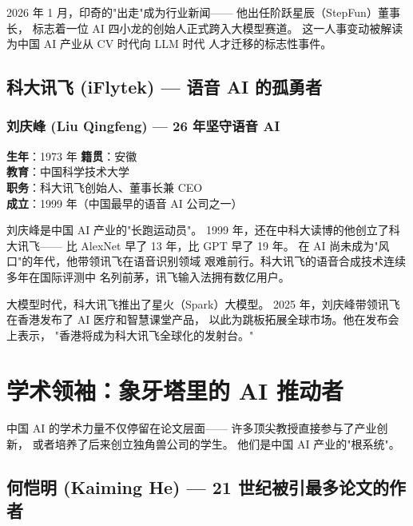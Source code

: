 2026 年 1 月，印奇的"出走"成为行业新闻——
他出任阶跃星辰（StepFun）董事长，
标志着一位 AI 四小龙的创始人正式跨入大模型赛道。
这一人事变动被解读为中国 AI 产业从 CV 时代向 LLM 时代
人才迁移的标志性事件。


\subsection{科大讯飞 (iFlytek) — 语音 AI 的孤勇者}

\subsubsection{刘庆峰 (Liu Qingfeng) — 26 年坚守语音 AI}

\begin{keybox}
\textbf{生年}：1973 年 \quad \textbf{籍贯}：安徽 \\
\textbf{教育}：中国科学技术大学 \\
\textbf{职务}：科大讯飞创始人、董事长兼 CEO \\
\textbf{成立}：1999 年（中国最早的语音 AI 公司之一）
\end{keybox}

刘庆峰是中国 AI 产业的"长跑运动员"。
1999 年，还在中科大读博的他创立了科大讯飞——
比 AlexNet 早了 13 年，比 GPT 早了 19 年。
在 AI 尚未成为"风口"的年代，他带领讯飞在语音识别领域
艰难前行。科大讯飞的语音合成技术连续多年在国际评测中
名列前茅，讯飞输入法拥有数亿用户。

大模型时代，科大讯飞推出了星火（Spark）大模型。
2025 年，刘庆峰带领讯飞在香港发布了 AI 医疗和智慧课堂产品，
以此为跳板拓展全球市场。他在发布会上表示，
"香港将成为科大讯飞全球化的发射台。"



\section{学术领袖：象牙塔里的 AI 推动者}
\label{sec:academics}

中国 AI 的学术力量不仅停留在论文层面——
许多顶尖教授直接参与了产业创新，
或者培养了后来创立独角兽公司的学生。
他们是中国 AI 产业的"根系统"。


\subsection{何恺明 (Kaiming He) — 21 世纪被引最多论文的作者}

